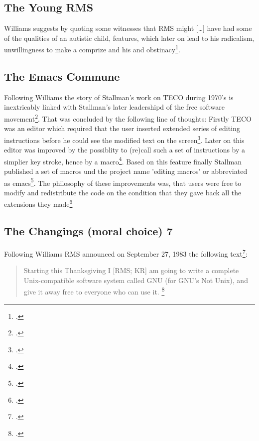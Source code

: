 \documentclass[DIV=calc,BCOR=5mm,11pt,headings=small,oneside,abstract=true, toc=bib]{scrartcl}
\begin{document}
\subsection{The Young RMS}

Williams suggests by quoting some witnesses that RMS might \glqq{}[\ldots]
have had some of the qualities of an autistic child\grqq{}, features, which
later on lead to his radicalism, unwillingness to make a comprize and his and
obstinacy\footcite[cf][31 et passim]{Williams2002a}.

\subsection{The Emacs Commune}

Following Williams \glqq{}the story of Stallman's work on TECO during 1970's is
inextricably linked with Stallman's later leadershipd of the free software
movement\grqq{}\footcite[cf][80]{Williams2002a}. That was concluded by the
following line of thoughts: Firstly TECO was an editor which required that the
user inserted \glqq{}extended series of editing instructions\grqq{} before he
could see the modified text on the screen\footcite[cf][81]{Williams2002a}. Later
on this editor was improved by the possiblity to (re)call such a set of
instructions by a simplier key stroke, hence by a
macro\footcite[cf][82]{Williams2002a}. Based on this feature finally Stallman
published a set of macros und the project name 'editing macros' or abbreviated
as \glqq{}emacs\grqq{}\footcite[cf][84f]{Williams2002a}. The philosophy of these
improvements was, that \glqq{}users were free to modify and redistribute the
code on the condition that they gave back all the extensions they
made\grqq{}\footcite[cf][85]{Williams2002a}

\subsection{The Changings (moral choice) 7}

Following Williams RMS announced \glqq{}on September 27, 1983\grqq{} the
following text\footcite[cf][85]{Williams2002a}:

\begin{quote}
\glqq{}Starting this Thanksgiving I [RMS; KR] am going to write a complete
Unix-compatible software system called GNU (for GNU's Not Unix), and give it away free to
everyone who can use it.
\grqq{}\footcite[][85]{Williams2002a}
\end{quote}
\end{document}
